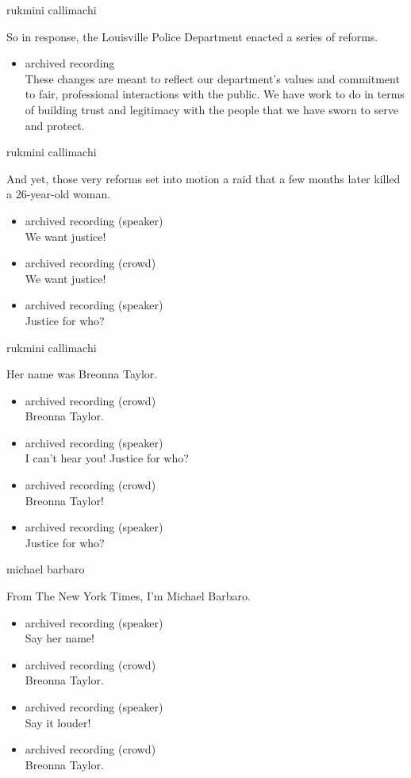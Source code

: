 rukmini callimachi

So in response, the Louisville Police Department enacted a series of
reforms.

\begin{itemize}
\tightlist
\item
  archived recording\\
  These changes are meant to reflect our department's values and
  commitment to fair, professional interactions with the public. We have
  work to do in terms of building trust and legitimacy with the people
  that we have sworn to serve and protect.
\end{itemize}

rukmini callimachi

And yet, those very reforms set into motion a raid that a few months
later killed a 26-year-old woman.

\begin{itemize}
\item
  archived recording (speaker)\\
  We want justice!
\item
  archived recording (crowd)\\
  We want justice!
\item
  archived recording (speaker)\\
  Justice for who?
\end{itemize}

rukmini callimachi

Her name was Breonna Taylor.

\begin{itemize}
\item
  archived recording (crowd)\\
  Breonna Taylor.
\item
  archived recording (speaker)\\
  I can't hear you! Justice for who?
\item
  archived recording (crowd)\\
  Breonna Taylor!
\item
  archived recording (speaker)\\
  Justice for who?
\end{itemize}

michael barbaro

From The New York Times, I'm Michael Barbaro.

\begin{itemize}
\item
  archived recording (speaker)\\
  Say her name!
\item
  archived recording (crowd)\\
  Breonna Taylor.
\item
  archived recording (speaker)\\
  Say it louder!
\item
  archived recording (crowd)\\
  Breonna Taylor.
\end{itemize}

